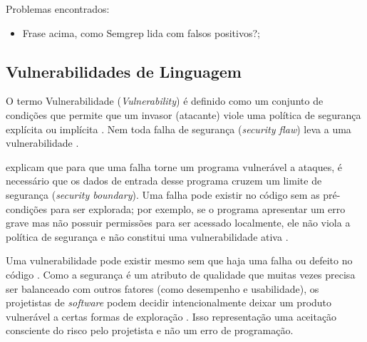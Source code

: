 \documentclass[
    12pt,                %
    openright,           %
    oneside,             %
    a4paper,             %
    english,             %
    brazil               %
]{abntex2}
\begin{document}
\begin{itemize}
\par
Problemas encontrados:

\begin{itemize}
  \item Frase acima, como Semgrep lida com falsos positivos?;
\end{itemize}

\subsection{Vulnerabilidades de Linguagem}
\label{sec:vulnerabilidadeslinguagem}
\par
O termo Vulnerabilidade (\textit{Vulnerability}) é definido como um conjunto de condições que permite que um invasor (atacante) viole uma política de segurança explícita ou implícita \cite{seacord2013secure, seicertc2016}.
Nem toda falha de segurança (\textit{security flaw}) leva a uma vulnerabilidade \cite{seacord2013secure}.
\par
{} explicam que para que uma falha torne um programa vulnerável a ataques, é necessário que os dados de entrada desse programa cruzem um limite de segurança (\textit{security boundary}).
Uma falha pode existir no código sem as pré-condições para ser explorada; por exemplo, se o programa apresentar um erro grave mas não possuir permissões para ser acessado localmente, ele não viola a política de segurança e não constitui uma vulnerabilidade ativa \cite{seacord2013secure}.
\par
Uma vulnerabilidade pode existir mesmo sem que haja uma falha ou defeito no código \cite{seacord2013secure}.
Como a segurança é um atributo de qualidade que muitas vezes precisa ser balanceado com outros fatores (como desempenho e usabilidade), os projetistas de \textit{software} podem decidir intencionalmente deixar um produto vulnerável a certas formas de exploração \cite{seacord2013secure}.
Isso representação uma aceitação consciente do risco pelo projetista e não um erro de programação.


\end{itemize}
\end{document}
